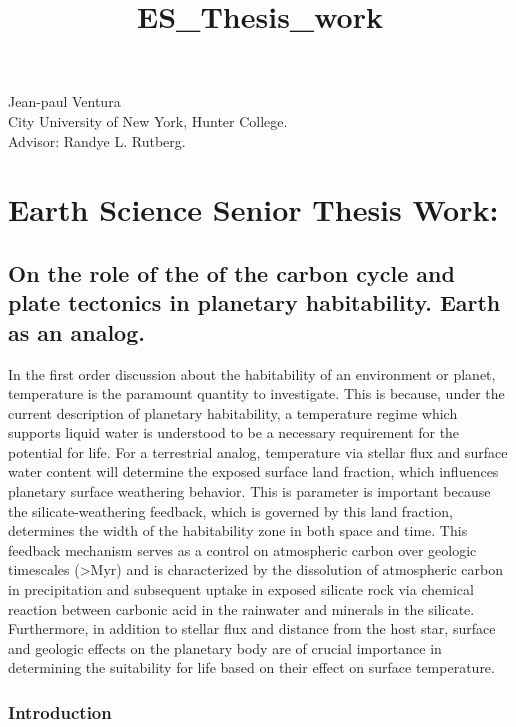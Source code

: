 \documentclass[11pt]{article}
\title{ES\_Thesis\_work}
\begin{document}
    
    
    \maketitle
    
    

    
    Jean-paul Ventura\\
City University of New York, Hunter College.\\
Advisor: Randye L. Rutberg.

    \section{Earth Science Senior Thesis
Work:}\label{earth-science-senior-thesis-work}

\subsection{On the role of the of the carbon cycle and plate tectonics
in planetary habitability. Earth as an
analog.}\label{on-the-role-of-the-of-the-carbon-cycle-and-plate-tectonics-in-planetary-habitability.-earth-as-an-analog.}

    In the first order discussion about the habitability of an environment
or planet, temperature is the paramount quantity to investigate. This is
because, under the current description of planetary habitability, a
temperature regime which supports liquid water is understood to be a
necessary requirement for the potential for life. For a terrestrial
analog, temperature via stellar flux and surface water content will
determine the exposed surface land fraction, which influences planetary
surface weathering behavior. This is parameter is important because the
silicate-weathering feedback, which is governed by this land fraction,
determines the width of the habitability zone in both space and time.
This feedback mechanism serves as a control on atmospheric carbon over
geologic timescales (\textgreater{}Myr) and is characterized by the
dissolution of atmospheric carbon in precipitation and subsequent uptake
in exposed silicate rock via chemical reaction between carbonic acid in
the rainwater and minerals in the silicate. Furthermore, in addition to
stellar flux and distance from the host star, surface and geologic
effects on the planetary body are of crucial importance in determining
the suitability for life based on their effect on surface temperature.

    \subsubsection{Introduction}\label{introduction}
\end{document}
